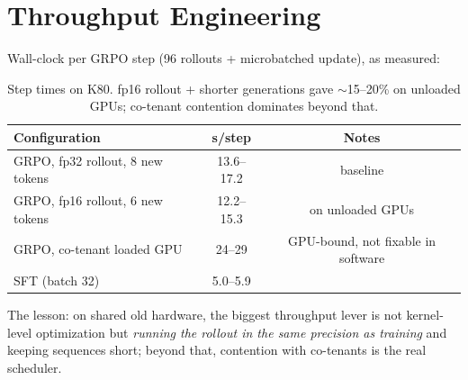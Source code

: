 \documentclass[11pt]{article}
\begin{document}
\section{Throughput Engineering}
\label{sec:throughput}
Wall-clock per GRPO step (96 rollouts + microbatched update), as measured:
\begin{table}[H]
\centering
\small
\begin{tabular}{lcc}
\toprule
Configuration & s/step & Notes \\
\midrule
GRPO, fp32 rollout, 8 new tokens & 13.6--17.2 & baseline \\
GRPO, fp16 rollout, 6 new tokens & 12.2--15.3 & on unloaded GPUs \\
GRPO, co-tenant loaded GPU & 24--29 & GPU-bound, not fixable in software \\
SFT (batch 32) & 5.0--5.9 & \\
\bottomrule
\end{tabular}
\caption{Step times on K80. fp16 rollout + shorter generations gave
$\sim$15--20\% on unloaded GPUs; co-tenant contention dominates beyond that.}
\end{table}
The lesson: on shared old hardware, the biggest throughput lever is not
kernel-level optimization but \emph{running the rollout in the same precision
as training} and keeping sequences short; beyond that, contention with
co-tenants is the real scheduler.
\end{document}

